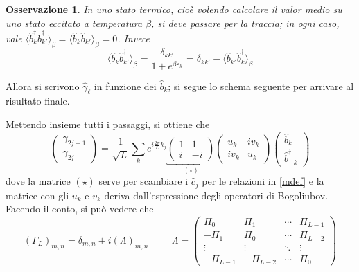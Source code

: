 \documentclass[11pt, a4paper]{scrartcl}
\theoremstyle{style}
\newtheorem{osservazione}{Osservazione}[section]
\theoremstyle{style1}
\numberwithin{equation}{subsection}
\begin{document}
\begin{osservazione}
In uno stato termico, cio\`e volendo calcolare il valor medio su uno stato eccitato a temperatura $\beta $, si deve passare per la traccia; in ogni caso, vale $\langle \hat{b}^\dagger _k \hat{b}^\dagger _{k'}  \rangle_\beta = \langle \hat{b}_k \hat{b}_{k'}  \rangle_\beta  = 0$.
Invece
\[
\langle \hat{b}_k \hat{b}_{k'} ^\dagger  \rangle_\beta  = \frac{\delta _{kk'} }{1 + e^{\beta  \varepsilon _k}}= \delta _{k k'} - \langle \hat{b}_{k'} \hat{b}^\dagger _k \rangle_\beta 
\] 
\end{osservazione}
\noindent Allora si scrivono $\hat{\gamma}_\ell $ in funzione dei $\hat{b}_k$; si segue lo schema seguente per arrivare al risultato finale.
\begin{center}
\end{center}
Mettendo insieme tutti i passaggi, si ottiene che
\[
	\begin{pmatrix} \gamma_{2 j -1}  \\ \gamma_{2j}  \end{pmatrix} = \frac{1}{\sqrt{L} } \sum_{k}^{} e^{i \frac{2\pi }{L}k_j} \underbracket{\begin{pmatrix} 1 & 1 \\ i & - i \end{pmatrix}}_{(\star)}  \begin{pmatrix} u_k & i v_k \\ i v_k & u_k  \end{pmatrix} \begin{pmatrix} \hat{b}_k \\ \hat{b}_{-k} ^\dagger \end{pmatrix} 
\] 
dove la matrice $(\star)$ serve per scambiare i $\hat{c}_j$ per le relazioni in \ref{mdef} e la matrice con gli $u_k$ e $v_k$ deriva dall'espressione degli operatori di Bogoliubov.
Facendo il conto, si pu\`o vedere che 
\[
	(\Gamma_L)_{m,n} =\delta _{m,n} + i (\Lambda )_{m,n}  \hspace{1cm} \Lambda = \begin{pmatrix} \Pi _0 & \Pi _1 & \cdots & \Pi_{L-1}\\ -\Pi_1 & \Pi_0 & \cdots & \Pi _{L-2} \\ \vdots & \vdots & \ddots & \vdots \\ -\Pi_{L-1}  & - \Pi _{L-2} & \cdots & \Pi _0\end{pmatrix} 
\] 
\end{document}
